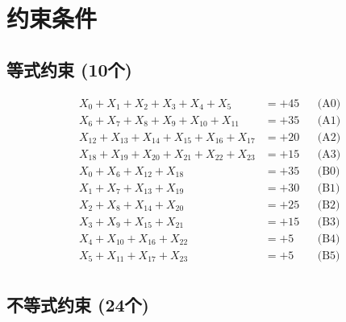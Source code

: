 \documentclass[a4paper,10pt]{article}
\begin{document}
\section{约束条件}

\subsection{等式约束 (10个)}

\allowdisplaybreaks
{\small
\begin{align}
X_{0} + X_{1} + X_{2} + X_{3} + X_{4} + X_{5} &= +45 && \text{(A0)} \\
X_{6} + X_{7} + X_{8} + X_{9} + X_{10} + X_{11} &= +35 && \text{(A1)} \\
X_{12} + X_{13} + X_{14} + X_{15} + X_{16} + X_{17} &= +20 && \text{(A2)} \\
X_{18} + X_{19} + X_{20} + X_{21} + X_{22} + X_{23} &= +15 && \text{(A3)} \\
X_{0} + X_{6} + X_{12} + X_{18} &= +35 && \text{(B0)} \\
\allowbreak
X_{1} + X_{7} + X_{13} + X_{19} &= +30 && \text{(B1)} \\
X_{2} + X_{8} + X_{14} + X_{20} &= +25 && \text{(B2)} \\
X_{3} + X_{9} + X_{15} + X_{21} &= +15 && \text{(B3)} \\
X_{4} + X_{10} + X_{16} + X_{22} &= +5 && \text{(B4)} \\
X_{5} + X_{11} + X_{17} + X_{23} &= +5 && \text{(B5)} \\
\end{align}
}

\subsection{不等式约束 (24个)}
\end{document}
